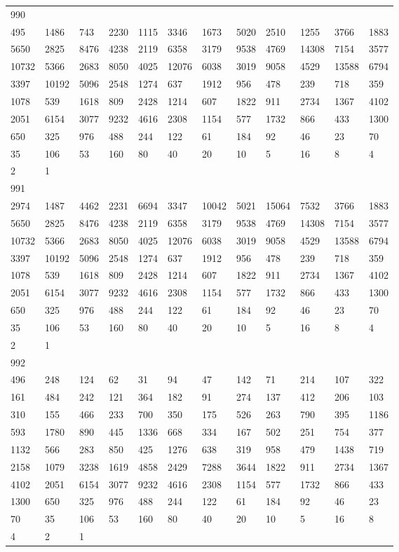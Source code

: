 \begin{longtable}{llllllllllll}
990&&&&&&&&&&&\\
495& 1486& 743& 2230& 1115& 3346& 1673& 5020& 2510& 1255& 3766& 1883\\
5650& 2825& 8476& 4238& 2119& 6358& 3179& 9538& 4769& 14308& 7154& 3577\\
10732& 5366& 2683& 8050& 4025& 12076& 6038& 3019& 9058& 4529& 13588& 6794\\
3397& 10192& 5096& 2548& 1274& 637& 1912& 956& 478& 239& 718& 359\\
1078& 539& 1618& 809& 2428& 1214& 607& 1822& 911& 2734& 1367& 4102\\
2051& 6154& 3077& 9232& 4616& 2308& 1154& 577& 1732& 866& 433& 1300\\
650& 325& 976& 488& 244& 122& 61& 184& 92& 46& 23& 70\\
35& 106& 53& 160& 80& 40& 20& 10& 5& 16& 8& 4\\
2& 1& \\

991&&&&&&&&&&&\\
2974& 1487& 4462& 2231& 6694& 3347& 10042& 5021& 15064& 7532& 3766& 1883\\
5650& 2825& 8476& 4238& 2119& 6358& 3179& 9538& 4769& 14308& 7154& 3577\\
10732& 5366& 2683& 8050& 4025& 12076& 6038& 3019& 9058& 4529& 13588& 6794\\
3397& 10192& 5096& 2548& 1274& 637& 1912& 956& 478& 239& 718& 359\\
1078& 539& 1618& 809& 2428& 1214& 607& 1822& 911& 2734& 1367& 4102\\
2051& 6154& 3077& 9232& 4616& 2308& 1154& 577& 1732& 866& 433& 1300\\
650& 325& 976& 488& 244& 122& 61& 184& 92& 46& 23& 70\\
35& 106& 53& 160& 80& 40& 20& 10& 5& 16& 8& 4\\
2& 1& \\

992&&&&&&&&&&&\\
496& 248& 124& 62& 31& 94& 47& 142& 71& 214& 107& 322\\
161& 484& 242& 121& 364& 182& 91& 274& 137& 412& 206& 103\\
310& 155& 466& 233& 700& 350& 175& 526& 263& 790& 395& 1186\\
593& 1780& 890& 445& 1336& 668& 334& 167& 502& 251& 754& 377\\
1132& 566& 283& 850& 425& 1276& 638& 319& 958& 479& 1438& 719\\
2158& 1079& 3238& 1619& 4858& 2429& 7288& 3644& 1822& 911& 2734& 1367\\
4102& 2051& 6154& 3077& 9232& 4616& 2308& 1154& 577& 1732& 866& 433\\
1300& 650& 325& 976& 488& 244& 122& 61& 184& 92& 46& 23\\
70& 35& 106& 53& 160& 80& 40& 20& 10& 5& 16& 8\\
4& 2& 1& \\


\end{longtable}
